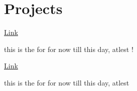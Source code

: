 \documentclass{resumecustom}%
\begin{document}
\begin{minipage}[t]{0.66\textwidth}
\section{Projects}%
%
\textbar{} \href{youtube.com}{Link}%
\vspace{\topsep}%
\begin{tightemize}%
\item this is the for for now till this day, atlest !%
\end{tightemize}%
\sectionsep%
%
\textbar{} \href{gogole.com}{Link}%
\vspace{\topsep}%
\begin{tightemize}%
\item this is the for for now till this day, atlest%
\end{tightemize}%
\sectionsep%
\end{minipage}%
\end{document}
